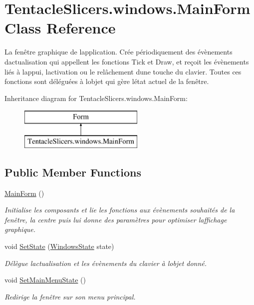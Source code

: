\hypertarget{class_tentacle_slicers_1_1windows_1_1_main_form}{}\section{Tentacle\+Slicers.\+windows.\+Main\+Form Class Reference}
\label{class_tentacle_slicers_1_1windows_1_1_main_form}


La fenêtre graphique de l\textquotesingle{}application. Crée périodiquement des évènements d\textquotesingle{}actualisation qui appellent les fonctions Tick et Draw, et reçoit les évènements liés à l\textquotesingle{}appui, l\textquotesingle{}activation ou le relâchement d\textquotesingle{}une touche du clavier. Toutes ces fonctions sont déléguées à l\textquotesingle{}objet qui gère l\textquotesingle{}état actuel de la fenêtre.  


Inheritance diagram for Tentacle\+Slicers.\+windows.\+Main\+Form\+:\begin{figure}[H]
\begin{center}
\leavevmode
\includegraphics[height=2.000000cm]{class_tentacle_slicers_1_1windows_1_1_main_form}
\end{center}
\end{figure}
\subsection*{Public Member Functions}
\begin{DoxyCompactItemize}
\item 
\hyperlink{class_tentacle_slicers_1_1windows_1_1_main_form_ab26b07ac69e8660776a2215b15c9e3af}{Main\+Form} ()
\begin{DoxyCompactList}\small\item\em Initialise les composants et lie les fonctions aux évènements souhaités de la fenêtre, la centre puis lui donne des paramètres pour optimiser l\textquotesingle{}affichage graphique. \end{DoxyCompactList}\item 
void \hyperlink{class_tentacle_slicers_1_1windows_1_1_main_form_a2461078968bccf75e2e7c39ec2f639b4}{Set\+State} (\hyperlink{class_tentacle_slicers_1_1windows_1_1_windows_state}{Windows\+State} state)
\begin{DoxyCompactList}\small\item\em Délègue l\textquotesingle{}actualisation et les évènements du clavier à l\textquotesingle{}objet donné. \end{DoxyCompactList}\item 
void \hyperlink{class_tentacle_slicers_1_1windows_1_1_main_form_a07b1f7939f2b2def69267b20066eec16}{Set\+Main\+Menu\+State} ()
\begin{DoxyCompactList}\small\item\em Redirige la fenêtre sur son menu principal. \end{DoxyCompactList}\end{DoxyCompactItemize}
